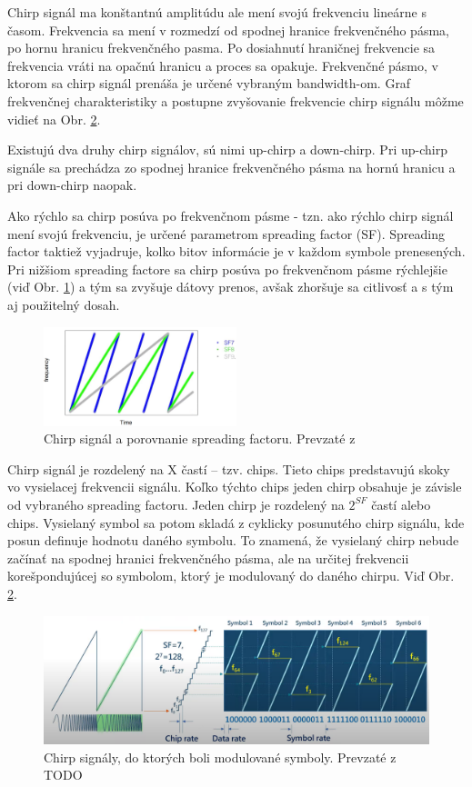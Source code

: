 \documentclass[slovak,master]{diploma}
\begin{document}
Chirp signál ma konštantnú amplitúdu ale mení svojú frekvenciu lineárne s časom. 
Frekvencia sa mení v rozmedzí od spodnej hranice frekvenčného pásma, po hornu hranicu frekvenčného pasma.
Po dosiahnutí hraničnej frekvencie sa frekvencia vráti na opačnú hranicu a proces sa opakuje.
Frekvenčné pásmo, v ktorom sa chirp signál prenáša je určené vybraným bandwidth-om.
Graf frekvenčnej charakteristiky a postupne zvyšovanie frekvencie chirp signálu môžme vidieť na Obr. \ref{fig:loraSymbols}.

Existujú dva druhy chirp signálov, sú nimi up-chirp a down-chirp. Pri up-chirp signále sa prechádza zo spodnej hranice frekvenčného pásma na hornú hranicu a pri 
down-chirp naopak.

Ako rýchlo sa chirp posúva po frekvenčnom pásme - tzn. ako rýchlo chirp signál mení svojú frekvenciu, je určené parametrom spreading factor (SF). Spreading factor taktiež vyjadruje, kolko bitov informácie je v každom 
symbole prenesených. Pri nižšiom spreading factore sa chirp posúva po frekvenčnom pásme rýchlejšie (viď Obr. \ref{fig:spreadingfactors}) a tým sa zvyšuje dátovy prenos, 
avšak zhoršuje sa citlivosť a s tým aj použitelný dosah.

\begin{figure}
	\centering
	\includegraphics[width=0.5\textwidth]{Figures/spreading factors.png}
	\caption{Chirp signál a porovnanie spreading factoru. Prevzaté z \cite{spreadfactorimage}}
	\label{fig:spreadingfactors}
\end{figure}

Chirp signál je rozdelený na X častí -- tzv. chips. Tieto chips predstavujú skoky vo vysielacej frekvencii signálu. 
Koľko týchto chips jeden chirp obsahuje je závisle od vybraného spreading factoru. 
Jeden chirp je rozdelený na $2^{SF}$ častí alebo chips. Vysielaný symbol sa potom skladá z cyklicky posunutého chirp signálu, kde posun definuje hodnotu daného symbolu. 
To znamená, že vysielaný chirp nebude začínať na spodnej hranici frekvenčného pásma, ale na určitej frekvencii korešpondujúcej so symbolom, 
ktorý je modulovaný do daného chirpu. Viď Obr. \ref{fig:loraSymbols}.

\begin{figure}
	\centering
	\includegraphics[width=1\textwidth]{Figures/loraSymbols.png}
	\caption{Chirp signály, do ktorých boli modulované symboly. Prevzaté z TODO}
	\label{fig:loraSymbols}
\end{figure}
\end{document}

